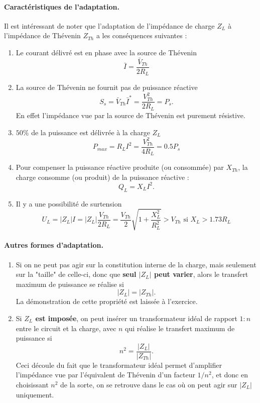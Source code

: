 \paragraph{Caractéristiques de l'adaptation.}
Il est intéressant de noter que l'adaptation de l'impédance de charge $Z_L$ à l'impédance de Thévenin $Z_{Th}$ a les conséquences suivantes :
\begin{enumerate}
	\item Le courant délivré est en phase avec la source de Thévenin $$\bar{I}=\frac{\bar{V}_{Th}}{2R_L}$$
	\item La source de Thévenin ne fournit pas de puissance réactive $$S_{s}=\bar{V}_{Th}\bar{I}^*=\frac{V_{Th}^2}{2R_L}= P_{s}.$$ 
	En effet l'impédance vue par la source de Thévenin est purement résistive.
	\item $50\%$ de la puissance est délivrée à la charge $Z_L$
	\[P_{max}=R_LI^2=\frac{V_{Th}^2}{4R_L}=0.5P_{s}\]
	\item Pour compenser la puissance réactive produite (ou consommée) par $X_{Th}$, la charge consomme (ou produit) de la puissance réactive : $$Q_L=X_LI^2.$$
	\item Il y a une possibilité de surtension
	\[U_L=|Z_L|I=|Z_L|\frac{V_{Th}}{2R_L}=\frac{V_{Th}}{2}\sqrt{1+\frac{X_L^2}{R_L^2}}
	> V_{Th} \text{~si~}X_L>1.73R_L\]
\end{enumerate}					

\paragraph{Autres formes d'adaptation.} \begin{enumerate}
	\item Si on ne peut pas agir sur la constitution interne de la charge, mais seulement sur la "taille" de celle-ci, donc que \textbf{seul $|Z_L|$ peut varier}, alors le transfert maximum de puissance se réalise si \[|Z_L|=|Z_{Th}|.\]
La démonstration de cette propriété est laissée à l'exercice.
\item Si \textbf{$Z_L$ est imposée}, on peut insérer un transformateur idéal de rapport $1:n$ entre le circuit et la
charge, avec $n$ qui réalise le transfert maximum de puissance si 
\[n^2=\frac{|Z_L|}{|Z_{Th}|}.\]
Ceci découle du fait que le transformateur idéal permet d'amplifier l'impédance vue par l'équivalent de Thévenin d'un facteur $1/n^2$, et donc en choisissant $n^2$ de la sorte, on se retrouve dans le cas où on peut agir sur $|Z_L|$ uniquement. 
\end{enumerate}




